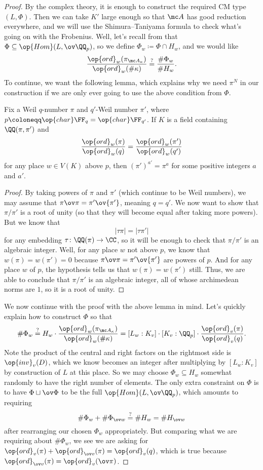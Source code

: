 \documentclass[../notes.tex]{subfiles}
\begin{document}
\begin{proof}
	By the complex theory, it is enough to construct the required CM type $(L,\Phi)$. Then we can take $K'$ large enough so that $\mc A$ has good reduction everywhere, and we will use the Shimura--Taniyama formula to check what's going on with the Frobenius. Well, let's recall from  that $\Phi\subseteq\op{Hom}(L,\ov\QQ_p)$, so we define $\Phi_w\coloneqq\Phi\cap H_w$, and we would like
	\[\frac{\op{ord}_w(\pi_{\mc A_\kappa})}{\op{ord}_w(\#\kappa)}\stackrel?=\frac{\#\Phi_w}{\#H_w}.\]
	To continue, we want the following lemma, which explains why we need $\pi^N$ in our construction if we are only ever going to use the above condition from $\Phi$.
	\begin{lemma}
		Fix a Weil $q$-number $\pi$ and $q'$-Weil number $\pi'$, where $p\coloneqq\op{char}\FF_q=\op{char}\FF_{q'}$. If $K$ is a field containing $\QQ(\pi,\pi')$ and
		\[\frac{\op{ord}_w(\pi)}{\op{ord}_w(q)}=\frac{\op{ord}_w(\pi')}{\op{ord}_w(q')}\]
		for any place $w\in V(K)$ above $p$, then $(\pi')^{a'}=\pi^a$ for some positive integers $a$ and $a'$.
	\end{lemma}
	\begin{proof}
		By taking powers of $\pi$ and $\pi'$ (which continue to be Weil numbers), we may assume that $\pi\ov\pi=\pi'\ov{\pi'}$, meaning $q=q'$. We now want to show that $\pi/\pi'$ is a root of unity (so that they will become equal after taking more powers). But we know that
		\[\left|\tau\pi\right|=\left|\tau\pi'\right|\]
		for any embedding $\tau\colon\QQ(\pi)\to\CC$, so it will be enough to check that $\pi/\pi'$ is an algebraic integer. Well, for any place $w$ not above $p$, we know that $w(\pi)=w(\pi')=0$ because $\pi\ov\pi=\pi'\ov{\pi'}$ are powers of $p$. And for any place $w$ of $p$, the hypothesis tells us that $w(\pi)=w(\pi')$ still. Thus, we are able to conclude that $\pi/\pi'$ is an algebraic integer, all of whose archimedean norms are $1$, so it is a root of unity.
	\end{proof}
	We now continue with the proof with the above lemma in mind. Let's quickly explain how to construct $\Phi$ so that
	\[\#\Phi_w\stackrel?=H_w\cdot\frac{\op{ord}_w(\pi_{\mc A_\kappa})}{\op{ord}_w(\#\kappa)}=[L_w:K_v]\cdot[K_v:\QQ_p]\cdot\frac{\op{ord}_v(\pi)}{\op{ord}_v(q)}.\]
	Note the product of the central and right factors on the rightmost side is $\op{inv}_v(D)$, which we know becomes an integer after multiplying by $[L_w:K_v]$ by construction of $L$ at this place. So we may choose $\Phi_w\subseteq H_w$ somewhat randomly to have the right number of elements. The only extra constraint on $\Phi$ is to have $\Phi\sqcup \ov\Phi$ to be the full $\op{Hom}(L,\ov\QQ_p)$, which amounts to requiring
	\[\#\Phi_w+\#\Phi_{\ov w}\stackrel?=\#H_w=\#H_{\ov w}\]
	after rearranging our chosen $\Phi_w$ appropriately. But comparing what we are requiring about $\#\Phi_w$, we see we are asking for $\op{ord}_v(\pi)+\op{ord}_{\ov v}(\pi)=\op{ord}_v(q)$, which is true because $\op{ord}_{\ov v}(\pi)=\op{ord}_v(\ov\pi)$.


\end{proof}
\end{document}
